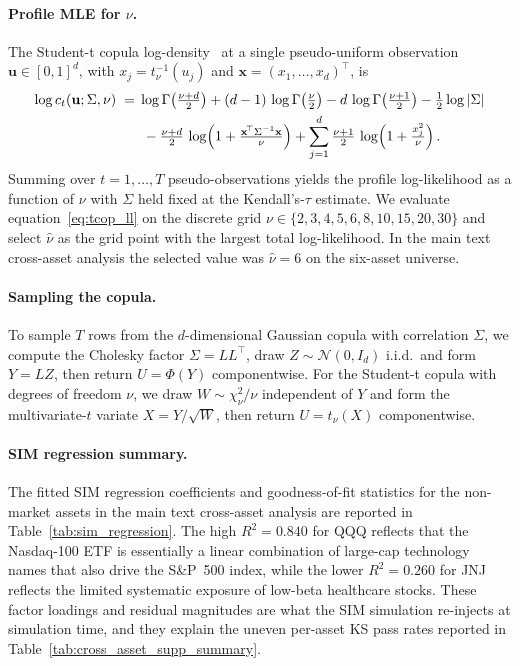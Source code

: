\paragraph{Profile MLE for $\nu$.}
The Student-t copula log-density~\citep{demarta2005tcopula} at a single pseudo-uniform observation $\mathbf{u} \in [0,1]^d$, with $x_j = t_\nu^{-1}(u_j)$ and $\mathbf{x} = (x_1, \dots, x_d)^\top$, is
\begin{align}
    \log c_t(\mathbf{u}; \Sigma, \nu)
    \;=\;&
    \log \Gamma\!\left(\tfrac{\nu+d}{2}\right)
    + (d-1)\,\log \Gamma\!\left(\tfrac{\nu}{2}\right)
    - d\,\log \Gamma\!\left(\tfrac{\nu+1}{2}\right)
    - \tfrac{1}{2} \log |\Sigma|
    \notag \\
    &\;
    - \tfrac{\nu+d}{2}\,\log\!\left(1 + \tfrac{\mathbf{x}^{\!\top} \Sigma^{-1} \mathbf{x}}{\nu}\right)
    + \sum_{j=1}^{d} \tfrac{\nu+1}{2}\,\log\!\left(1 + \tfrac{x_j^2}{\nu}\right).
    \label{eq:tcop_ll}
\end{align}
Summing over $t = 1, \dots, T$ pseudo-observations yields the profile log-likelihood as a function of $\nu$ with $\Sigma$ held fixed at the Kendall's-$\tau$ estimate.
We evaluate equation~\eqref{eq:tcop_ll} on the discrete grid $\nu \in \{2, 3, 4, 5, 6, 8, 10, 15, 20, 30\}$ and select $\hat{\nu}$ as the grid point with the largest total log-likelihood.
In the main text cross-asset analysis the selected value was $\hat{\nu} = 6$ on the six-asset universe.

\paragraph{Sampling the copula.}
To sample $T$ rows from the $d$-dimensional Gaussian copula with correlation $\Sigma$, we compute the Cholesky factor $\Sigma = L L^\top$, draw $Z \sim \mathcal{N}(0, I_d)$ i.i.d.\ and form $Y = L Z$, then return $U = \Phi(Y)$ componentwise.
For the Student-t copula with degrees of freedom $\nu$, we draw $W \sim \chi^2_\nu / \nu$ independent of $Y$ and form the multivariate-$t$ variate $X = Y / \sqrt{W}$, then return $U = t_\nu(X)$ componentwise.

\paragraph{SIM regression summary.}
The fitted SIM regression coefficients and goodness-of-fit statistics for the non-market assets in the main text cross-asset analysis are reported in Table~\ref{tab:sim_regression}.
The high $R^2 = 0.840$ for QQQ reflects that the Nasdaq-100 ETF is essentially a linear combination of large-cap technology names that also drive the S\&P~500 index, while the lower $R^2 = 0.260$ for JNJ reflects the limited systematic exposure of low-beta healthcare stocks.
These factor loadings and residual magnitudes are what the SIM simulation re-injects at simulation time, and they explain the uneven per-asset KS pass rates reported in Table~\ref{tab:cross_asset_supp_summary}.

